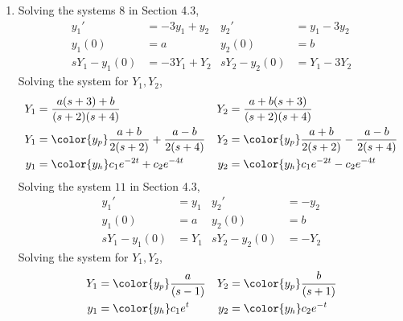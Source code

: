 \begin{enumerate}
\begin{enumerate}
              \item Solving the systems $ 8 $ in Section 4.3,
                    \begin{align}
                        y_1'          & = -3y_1 + y_2 &
                        y_2'          & = y_1 - 3y_2    \\
                        y_1(0)        & = a           &
                        y_2(0)        & = b             \\
                        sY_1 - y_1(0) & = -3Y_1 + Y_2 &
                        sY_2 - y_2(0) & = Y_1 - 3Y_2
                    \end{align}
                    Solving the system for $ Y_1, Y_2 $,
                    \begin{align}
                        Y_1      & = \frac{a(s + 3) + b}{(s + 2)(s + 4)}             &
                        Y_2      & = \frac{a + b(s + 3)}{(s + 2)(s + 4)}               \\
                        Y_1      & = \color{y_p} \frac{a + b}{2(s+2)} + \frac{a - b}
                        {2(s+4)} &
                        Y_2      & = \color{y_p} \frac{a+b}{2(s+2)} - \frac{a-b}
                        {2(s+4)}                                                       \\
                        y_1      & = \color{y_h} c_1 e^{-2t} + c_2 e^{-4t}           &
                        y_2      & = \color{y_h} c_1 e^{-2t} - c_2 e^{-4t}
                    \end{align}
                    Solving the system $ 11 $ in Section 4.3,
                    \begin{align}
                        y_1'          & = y_1  &
                        y_2'          & = -y_2   \\
                        y_1(0)        & = a    &
                        y_2(0)        & = b      \\
                        sY_1 - y_1(0) & = Y_1  &
                        sY_2 - y_2(0) & = -Y_2
                    \end{align}
                    Solving the system for $ Y_1, Y_2 $,
                    \begin{align}
                        Y_1 & = \color{y_p}\frac{a}{(s - 1)} &
                        Y_2 & = \color{y_p}\frac{b}{(s + 1)}   \\
                        y_1 & = \color{y_h} c_1 e^{t}        &
                        y_2 & = \color{y_h} c_2 e^{-t}
                    \end{align}

\end{enumerate}
\end{enumerate}
